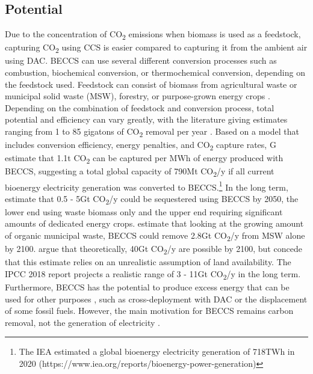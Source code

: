 \subsection*{Potential}
Due to the concentration of CO\textsubscript{2} emissions when biomass is used as a feedstock, capturing CO\textsubscript{2} using CCS is easier compared to capturing it from the ambient air using DAC. BECCS can use several different conversion processes such as combustion, biochemical conversion, or thermochemical conversion, depending on the feedstock used. Feedstock can consist of biomass from agricultural waste or municipal solid waste (MSW), forestry, or purpose-grown energy crops \parencite{Dipple2021TheSystems}. Depending on the combination of feedstock and conversion process, total potential and efficiency can vary greatly, with the literature giving estimates ranging from 1 to 85 gigatons of CO\textsubscript{2} removal per year \parencite[342]{IPCC2018Global1.5C}.
Based on a model that includes conversion efficiency, energy penalties, and CO\textsubscript{2} capture rates, G\textcite{Garcia-Freites2021TheTarget} estimate that 1.1t CO\textsubscript{2} can be captured per MWh of energy produced with BECCS, suggesting a total global capacity of 790Mt CO\textsubscript{2}/y if all current bioenergy electricity generation was converted to BECCS.\footnote{The IEA estimated a global bioenergy electricity generation of 718TWh in 2020 (https://www.iea.org/reports/bioenergy-power-generation)}
In the long term, \textcite{Fuss2018NegativeEffects} estimate that 0.5 - 5Gt CO\textsubscript{2}/y could be sequestered using BECCS by 2050, the lower end using waste biomass only and the upper end requiring significant amounts of dedicated energy crops. \textcite{Pour2018PotentialBECCS} estimate that looking at the growing amount of organic municipal waste, BECCS could remove 2.8Gt CO\textsubscript{2}/y from MSW alone by 2100. \textcite{Hanssen2020TheStorage} argue that theoretically, 40Gt CO\textsubscript{2}/y are possible by 2100, but concede that this estimate relies on an unrealistic assumption of land availability.
The IPCC 2018 report projects a realistic range of 3 - 11Gt CO\textsubscript{2}/y in the long term.
Furthermore, BECCS has the potential to produce excess energy that can be used for other purposes \textcite{Fajardy2017CanEmissions}, such as cross-deployment with DAC or the displacement of some fossil fuels. However, the main motivation for BECCS remains carbon removal, not the generation of electricity \textcite{Klein2014TheREMIND-MAgPIE}.
